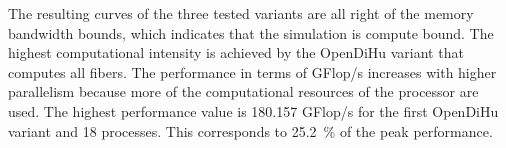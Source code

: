 The resulting curves of the three tested variants are all right of the memory bandwidth bounds, which indicates that the simulation is compute bound. The highest computational intensity is achieved by the OpenDiHu variant that computes all fibers. The performance in terms of GFlop/s increases with higher parallelism because more of the computational resources of the processor are used. 
The highest performance value is \SI{180.157}{} GFlop/s for the first OpenDiHu variant and 18 processes. This corresponds to \SI{25.2}{\percent} of the peak performance.

% 

